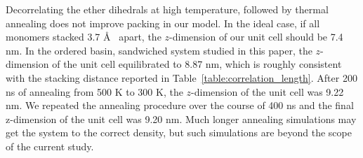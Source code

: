 \documentclass[journal=jpcbfk,manuscript=article]{achemso}
\begin{document}
  Decorrelating the ether dihedrals at high temperature, followed by thermal annealing
  does not improve packing in our model. In the ideal case, if all monomers stacked 
  3.7 \AA~ apart, the $z$-dimension of our unit cell should be 7.4 nm. In the ordered basin, 
  sandwiched system studied in this paper, the $z$-dimension of the unit cell equilibrated 
  to 8.87 nm, which is roughly consistent with the stacking distance reported in 
  Table~\ref{table:correlation_length}. After 200 ns of annealing from 500 K to 300 K, the 
  $z$-dimension of the unit cell was 9.22 nm. We repeated the annealing procedure over the 
  course of 400 ns and the final z-dimension of the unit cell was 9.20 nm. Much longer
  annealing simulations may get the system to the correct density, but such simulations are beyond
  the scope of the current study.

\end{document}
